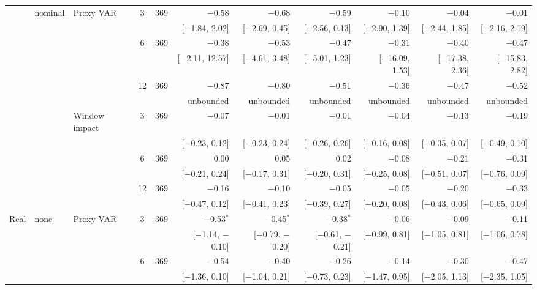\begin{table}[tp]
{\begin{tabular}{lllcrrrrrrr}
 & nominal & Proxy VAR & 3 & 369 & $-$0.58 & $-$0.68 & $-$0.59 & $-$0.10 & $-$0.04 & $-$0.01\\
 & & & & & {\tiny [$-$1.84, 2.02]} & {\tiny [$-$2.69, 0.45]} & {\tiny [$-$2.56, 0.13]} & {\tiny [$-$2.90, 1.39]} & {\tiny [$-$2.44, 1.85]} & {\tiny [$-$2.16, 2.19]}\\
 &  &  & 6 & 369 & $-$0.38 & $-$0.53 & $-$0.47 & $-$0.31 & $-$0.40 & $-$0.47\\
 & & & & & {\tiny [$-$2.11, 12.57]} & {\tiny [$-$4.61, 3.48]} & {\tiny [$-$5.01, 1.23]} & {\tiny [$-$16.09, 1.53]} & {\tiny [$-$17.38, 2.36]} & {\tiny [$-$15.83, 2.82]}\\
 &  &  & 12 & 369 & $-$0.87 & $-$0.80 & $-$0.51 & $-$0.36 & $-$0.47 & $-$0.52\\
 & & & & & {\tiny unbounded} & {\tiny unbounded} & {\tiny unbounded} & {\tiny unbounded} & {\tiny unbounded} & {\tiny unbounded}\\
 &  & Window impact & 3 & 369 & $-$0.07 & $-$0.01 & $-$0.01 & $-$0.04 & $-$0.13 & $-$0.19\\
 & & & & & {\tiny [$-$0.23, 0.12]} & {\tiny [$-$0.23, 0.24]} & {\tiny [$-$0.26, 0.26]} & {\tiny [$-$0.16, 0.08]} & {\tiny [$-$0.35, 0.07]} & {\tiny [$-$0.49, 0.10]}\\
 &  &  & 6 & 369 & 0.00 & 0.05 & 0.02 & $-$0.08 & $-$0.21 & $-$0.31\\
 & & & & & {\tiny [$-$0.21, 0.24]} & {\tiny [$-$0.17, 0.31]} & {\tiny [$-$0.20, 0.31]} & {\tiny [$-$0.25, 0.08]} & {\tiny [$-$0.51, 0.07]} & {\tiny [$-$0.76, 0.09]}\\
 &  &  & 12 & 369 & $-$0.16 & $-$0.10 & $-$0.05 & $-$0.05 & $-$0.20 & $-$0.33\\
 & & & & & {\tiny [$-$0.47, 0.12]} & {\tiny [$-$0.41, 0.23]} & {\tiny [$-$0.39, 0.27]} & {\tiny [$-$0.20, 0.08]} & {\tiny [$-$0.43, 0.06]} & {\tiny [$-$0.65, 0.09]}\\
\addlinespace
Real & none & Proxy VAR & 3 & 369 & $-$0.53$^{*}$ & $-$0.45$^{*}$ & $-$0.38$^{*}$ & $-$0.06 & $-$0.09 & $-$0.11\\
 & & & & & {\tiny [$-$1.14, $-$0.10]} & {\tiny [$-$0.79, $-$0.20]} & {\tiny [$-$0.61, $-$0.21]} & {\tiny [$-$0.99, 0.81]} & {\tiny [$-$1.05, 0.81]} & {\tiny [$-$1.06, 0.78]}\\
 &  &  & 6 & 369 & $-$0.54 & $-$0.40 & $-$0.26 & $-$0.14 & $-$0.30 & $-$0.47\\
 & & & & & {\tiny [$-$1.36, 0.10]} & {\tiny [$-$1.04, 0.21]} & {\tiny [$-$0.73, 0.23]} & {\tiny [$-$1.47, 0.95]} & {\tiny [$-$2.05, 1.13]} & {\tiny [$-$2.35, 1.05]}\\

\end{tabular}}
\end{table}
